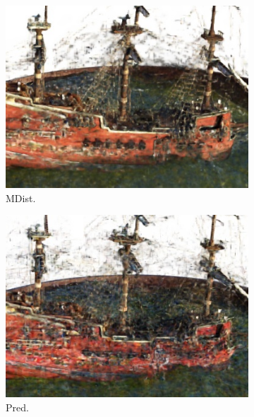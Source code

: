 \begin{figure}[ht!]
\begin{subfigure}{0.19\textwidth}
        \centering   
        \includegraphics[width=\linewidth]{figs/max_dist_ship.jpg}
          \caption{MDist.}
          \label{fig:sub2}
      \end{subfigure}
      \begin{subfigure}{0.19\textwidth}
        \centering   
        \includegraphics[width=\linewidth]{figs/uncertainty_ship.jpg}
          \caption{Pred.}
          \label{fig:sub2}
      \end{subfigure}
      \begin{subfigure}{0.19\textwidth}
        \centering   

\end{subfigure}
\end{figure}
